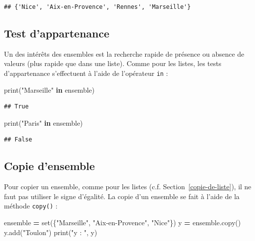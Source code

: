 \documentclass[12pt,]{book}
\newenvironment{Shaded}{\begin{snugshade}}{\end{snugshade}}
\newcommand{\KeywordTok}[1]{\textcolor[rgb]{0.13,0.29,0.53}{\textbf{#1}}}
\newcommand{\StringTok}[1]{\textcolor[rgb]{0.31,0.60,0.02}{#1}}
\newcommand{\OperatorTok}[1]{\textcolor[rgb]{0.81,0.36,0.00}{\textbf{#1}}}
\newcommand{\BuiltInTok}[1]{#1}
\newcommand{\NormalTok}[1]{#1}
\numberwithin{equation}{section}
\numberwithin{countremarque}{section}
\begin{document}
\begin{lstlisting}
## {'Nice', 'Aix-en-Provence', 'Rennes', 'Marseille'}
\end{lstlisting}

\subsection{Test d'appartenance}\label{test-dappartenance-1}

Un des intérêts des ensembles est la recherche rapide de présence ou
absence de valeurs (plus rapide que dans une liste). Comme pour les
listes, les tests d'appartenance s'effectuent à l'aide de l'opérateur
\texttt{in} :

\begin{Shaded}
\begin{Highlighting}[]
\BuiltInTok{print}\NormalTok{(}\StringTok{"Marseille"} \KeywordTok{in}\NormalTok{ ensemble)}
\end{Highlighting}
\end{Shaded}

\begin{lstlisting}
## True
\end{lstlisting}

\begin{Shaded}
\begin{Highlighting}[]
\BuiltInTok{print}\NormalTok{(}\StringTok{"Paris"} \KeywordTok{in}\NormalTok{ ensemble)}
\end{Highlighting}
\end{Shaded}

\begin{lstlisting}
## False
\end{lstlisting}

\subsection{Copie d'ensemble}\label{copie-densemble}

Pour copier un ensemble, comme pour les listes (c.f.
Section~\ref{copie-de-liste}), il ne faut pas utiliser le signe
d'égalité. La copie d'un ensemble se fait à l'aide de la méthode
\texttt{copy()} :

\begin{Shaded}
\begin{Highlighting}[]
\NormalTok{ensemble }\OperatorTok{=} \BuiltInTok{set}\NormalTok{(\{}\StringTok{"Marseille"}\NormalTok{, }\StringTok{"Aix-en-Provence"}\NormalTok{, }\StringTok{"Nice"}\NormalTok{\})}
\NormalTok{y }\OperatorTok{=}\NormalTok{ ensemble.copy()}
\NormalTok{y.add(}\StringTok{"Toulon"}\NormalTok{)}
\BuiltInTok{print}\NormalTok{(}\StringTok{"y : "}\NormalTok{, y)}
\end{Highlighting}
\end{Shaded}
\end{document}
